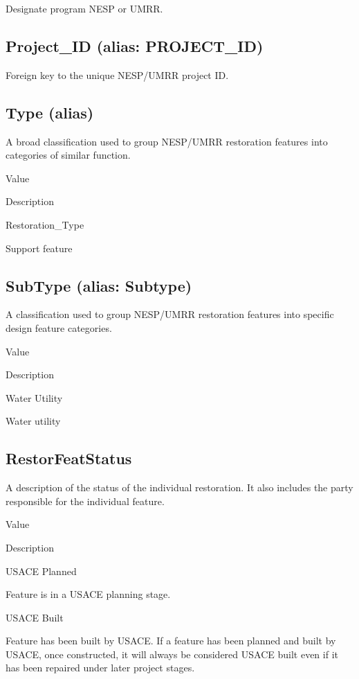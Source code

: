 \documentclass[
  letterpaper,
  DIV=11,
  numbers=noendperiod]{scrreprt}
\begin{document}
Designate program NESP or UMRR.

\subsection{Project\_ID (alias:
PROJECT\_ID)}\label{project_id-alias-project_id-26}

Foreign key to the unique NESP/UMRR project ID.

\subsection{Type (alias)}\label{type-alias-20}

A broad classification used to group NESP/UMRR restoration features into
categories of similar function.

Value

Description

Restoration\_Type

Support feature

\subsection{SubType (alias: Subtype)}\label{subtype-alias-subtype-26}

A classification used to group NESP/UMRR restoration features into
specific design feature categories.

Value

Description

Water Utility

Water utility

\subsection{RestorFeatStatus}\label{restorfeatstatus-26}

A description of the status of the individual restoration. It also
includes the party responsible for the individual feature.

Value

Description

USACE Planned

Feature is in a USACE planning stage.

USACE Built

Feature has been built by USACE. If a feature has been planned and built
by USACE, once constructed, it will always be considered USACE built
even if it has been repaired under later project stages.
\end{document}

